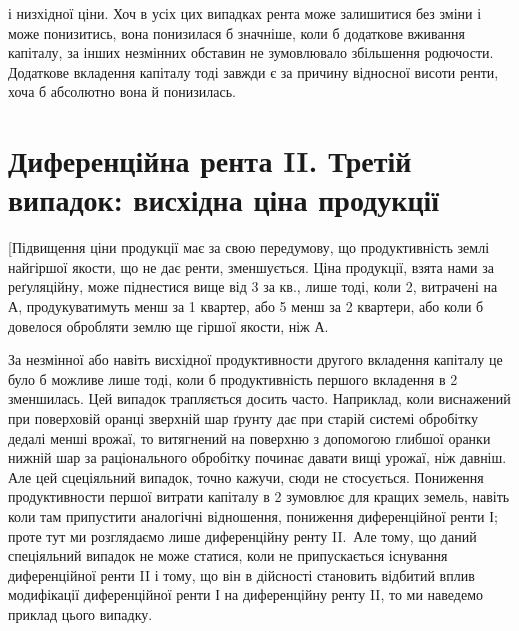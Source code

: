 \parcont{}  %
і низхідної ціни. Хоч в усіх цих випадках рента може залишитися без зміни
і може понизитись, вона понизилася б значніше, коли б додаткове вживання
капіталу, за інших незмінних обставин не зумовлювало збільшення родючости. Додаткове вкладення
капіталу тоді завжди є за причину відносної висоти ренти,
хоча б абсолютно вона й понизилась.

\section{Диференційна рента II. Третій випадок: висхідна ціна продукції}
\vspace{8\bigskipamount}

[Підвищення ціни продукції має за свою передумову, що продуктивність землі
найгіршої якости, що не дає ренти, зменшується. Ціна продукції, взята нами за
реґуляційну, може піднестися вище від 3 за кв., лише тоді, коли 2,
витрачені на $А$, продукуватимуть менш за 1 квартер, або 5 менш за
2 квартери, або коли б довелося обробляти землю ще гіршої якости, ніж $А$.

За незмінної або навіть висхідної продуктивности другого вкладення капіталу
це було б можливе лише тоді, коли б продуктивність першого вкладення в 2
зменшилась. Цей випадок трапляється досить часто. Наприклад, коли виснажений
при поверховій оранці зверхній шар ґрунту дає при старій системі обробітку
дедалі менші врожаї, то витягнений на поверхню з допомогою глибшої
оранки нижній шар за раціонального обробітку починає давати вищі
урожаї, ніж давніш. Але цей сцеціяльний випадок, точно кажучи, сюди не
стосується. Пониження продуктивности першої витрати капіталу в 2 зумовлює для кращих
земель, навіть коли там припустити аналогічні відношення,
пониження диференційної ренти І; проте тут ми розглядаємо лише диференційну
ренту II.~Але тому, що даний спеціяльний випадок не може статися, коли не
припускається існування диференційної ренти II і тому, що він в дійсності
становить відбитий вплив модифікації диференційної ренти І на диференційну
ренту II, то ми наведемо приклад цього випадку.

